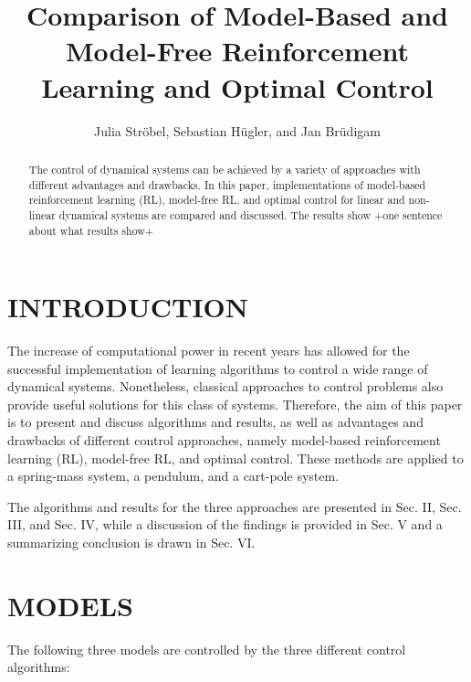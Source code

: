 \documentclass[letterpaper, 10 pt, conference]{ieeeconf}  %
\title{\LARGE \bf
Comparison of Model-Based and Model-Free Reinforcement Learning and Optimal Control
}
\author{Julia Str\"obel, Sebastian H\"ugler, and Jan Br\"udigam}
\begin{document}
\maketitle
\thispagestyle{empty}
\pagestyle{empty}


\begin{abstract}

The control of dynamical systems can be achieved by a variety of approaches with different advantages and drawbacks. In this paper, implementations of model-based reinforcement learning (RL), model-free RL, and optimal control for linear and non-linear dynamical systems are compared and discussed. The results show +one sentence about what results show+

\end{abstract}


\section{INTRODUCTION}

The increase of computational power in recent years has allowed for the successful implementation of learning algorithms to control a wide range of dynamical systems. Nonetheless, classical approaches to control problems also provide 
useful solutions for this class of systems. Therefore, the aim of this paper is to present and discuss algorithms and results, as well as advantages and drawbacks of different control approaches, namely model-based reinforcement learning (RL), model-free RL, and optimal control. These methods are applied to a spring-mass system, a pendulum, and a cart-pole system.

The algorithms and results for the three approaches are presented in Sec. II, Sec. III, and Sec. IV, while a discussion of the findings is provided in Sec. V and a summarizing conclusion is drawn in Sec. VI.

\section{MODELS}
The following three models are controlled by the three different control algorithms:
\end{document}
